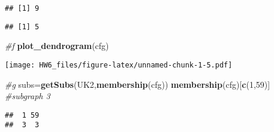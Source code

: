 \documentclass[
]{article}
\newenvironment{Shaded}{\begin{snugshade}}{\end{snugshade}}
\newcommand{\CommentTok}[1]{\textcolor[rgb]{0.56,0.35,0.01}{\textit{#1}}}
\newcommand{\DecValTok}[1]{\textcolor[rgb]{0.00,0.00,0.81}{#1}}
\newcommand{\KeywordTok}[1]{\textcolor[rgb]{0.13,0.29,0.53}{\textbf{#1}}}
\newcommand{\NormalTok}[1]{#1}
\newcommand{\StringTok}[1]{\textcolor[rgb]{0.31,0.60,0.02}{#1}}
\begin{document}
\begin{Shaded}
\end{Shaded}

\begin{verbatim}
## [1] 9
\end{verbatim}

\begin{Shaded}
\end{Shaded}

\begin{verbatim}
## [1] 5
\end{verbatim}

\begin{Shaded}
\begin{Highlighting}[]
\CommentTok{#f}
\KeywordTok{plot_dendrogram}\NormalTok{(cfg)}
\end{Highlighting}
\end{Shaded}

\texttt{[image: HW6\_files/figure-latex/unnamed-chunk-1-5.pdf]}

\begin{Shaded}
\begin{Highlighting}[]
\CommentTok{#g}
\NormalTok{subs=}\KeywordTok{getSubs}\NormalTok{(UK2,}\KeywordTok{membership}\NormalTok{(cfg))}
\KeywordTok{membership}\NormalTok{(cfg)[}\KeywordTok{c}\NormalTok{(}\DecValTok{1}\NormalTok{,}\DecValTok{59}\NormalTok{)]     }\CommentTok{#subgraph 3}
\end{Highlighting}
\end{Shaded}

\begin{verbatim}
##  1 59 
##  3  3
\end{verbatim}

\begin{Shaded}
\end{Shaded}
\end{document}
